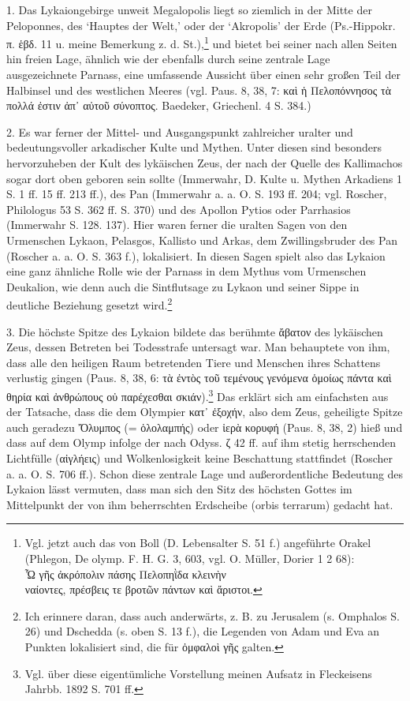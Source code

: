\documentclass[a4paper, 11pt, oneside]{article}
\begin{document}
1. Das Lykaiongebirge unweit Megalopolis liegt so ziemlich in der Mitte der Peloponnes, des `Hauptes der Welt,' oder der `Akropolis' der Erde (Ps.-Hippokr. π. ἑβδ. 11 u. meine Bemerkung z. d. St.),\footnote{Vgl. jetzt auch das von Boll (D. Lebensalter S. 51 f.) angeführte Orakel (Phlegon, De olymp. F. H. G. 3, 603, vgl. O. Müller, Dorier 1 2 68):\\\hspace*{10mm}Ὦ γῆς ἀκρόπολιν πάσης Πελοπηῒδα κλεινὴν\\\hspace*{10mm}ναίοντες, πρέσβεις τε βροτῶν πάντων καὶ ἄριστοι.} und bietet bei seiner nach allen Seiten hin freien Lage, ähnlich wie der ebenfalls durch seine zentrale Lage ausgezeichnete Parnass, eine umfassende Aussicht über einen sehr großen Teil der Halbinsel und des westlichen Meeres (vgl. Paus. 8, 38, 7: καὶ ἡ Πελοπόννησος τὰ πολλά ἐστιν ἀπ᾽ αὐτοῦ σύνοπτος. Baedeker, Griechenl. 4 S. 384.)

2. Es war ferner der Mittel- und Ausgangspunkt zahlreicher uralter und bedeutungsvoller arkadischer Kulte und Mythen. Unter diesen sind besonders hervorzuheben der Kult des lykäischen Zeus, der nach der Quelle des Kallimachos sogar dort oben geboren sein sollte (Immerwahr, D. Kulte u. Mythen Arkadiens 1 S. 1 ff. 15 ff. 213 ff.), des Pan (Immerwahr a. a. O. S. 193 ff. 204; vgl. Roscher, Philologus 53 S. 362 ff. S. 370) und des Apollon Pytios oder Parrhasios (Immerwahr S. 128. 137). Hier waren ferner die uralten Sagen von den Urmenschen Lykaon, Pelasgos, Kallisto und Arkas, dem Zwillingsbruder des Pan (Roscher a. a. O. S. 363 f.), lokalisiert. In diesen Sagen spielt also das Lykaion eine ganz ähnliche Rolle wie der Parnass in dem Mythus vom Urmenschen Deukalion, wie denn auch die Sintflutsage zu Lykaon und seiner Sippe in deutliche Beziehung gesetzt wird.\footnote{Ich erinnere daran, dass auch anderwärts, z. B. zu Jerusalem (s. Omphalos S. 26) und Dschedda (s. oben S. 13 f.), die Legenden von Adam und Eva an Punkten lokalisiert sind, die für ὀμφαλοὶ γῆς galten.}

3. Die höchste Spitze des Lykaion bildete das berühmte ἄβατον des lykäischen Zeus, dessen Betreten bei Todesstrafe untersagt war. Man behauptete von ihm, dass alle den heiligen Raum betretenden Tiere und Menschen ihres Schattens verlustig gingen (Paus. 8, 38, 6: τὰ ἐντὸς τοῦ τεμένους γενόμενα ὁμοίως πάντα καὶ θηρία καὶ ἀνθρώπους οὐ παρέχεσθαι σκιάν).\footnote{Vgl. über diese eigentümliche Vorstellung meinen Aufsatz in Fleckeisens Jahrbb. 1892 S. 701 ff.} Das erklärt sich am einfachsten aus der Tatsache, dass die dem Olympier κατ᾽ ἐξοχήν, also dem Zeus, geheiligte Spitze auch geradezu Ὄλυμπος (= ὁλολαμπής) oder ἱερὰ κορυφή (Paus. 8, 38, 2) hieß und dass auf dem Olymp infolge der nach Odyss. ζ 42 ff. auf ihm stetig herrschenden Lichtfülle (αἰγλήεις) und Wolkenlosigkeit keine Beschattung stattfindet (Roscher a. a. O. S. 706 ff.). Schon diese zentrale Lage und außerordentliche Bedeutung des Lykaion lässt vermuten, dass man sich den Sitz des höchsten Gottes im Mittelpunkt der von ihm beherrschten Erdscheibe (orbis terrarum) gedacht hat.
\end{document}
